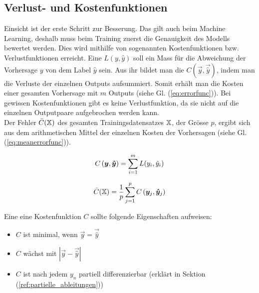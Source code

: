 \subsection{Verlust- und Kostenfunktionen}
Einsicht ist der erste Schritt zur Besserung. Das gilt auch beim Machine Learning, deshalb muss beim Training zuerst die Genauigkeit des Modells bewertet werden.
Dies wird mithilfe von sogenannten Kostenfunktionen bzw. Verlustfunktionen erreicht.
\para{}
Eine  $L(y,\hat{y})$ soll ein Mass für die
Abweichung der Vorhersage $y$ von dem Label $\hat{y}$ sein.
Aus ihr bildet man die  $C(\vec{y},\vec{\hat{y}})$, indem man die
Verluste der einzelnen Outputs aufsummiert. Somit erhält man die Kosten
einer gesamten Vorhersage mit $m$ Outputs (siehe Gl. (\ref{eq:errorfunc})). Bei
gewissen Kostenfunktionen gibt es keine Verlustfunktion, da sie nicht auf die
einzelnen Outputpaare aufgebrochen werden kann. \\
Der Fehler $\bar{C}(\mathbb{X})$ des gesamten Trainingsdatensatzes $\mathbb{X}$, der
Grösse $p$, ergibt sich aus dem arithmetischen Mittel der einzelnen Kosten der
Vorhersagen (siehe Gl. (\ref{eq:meanerrorfunc})).
\\
\begin{minipage}[h!]{0.5\textwidth}
  \begin{equation}\label{eq:errorfunc}
    C \left(\bm{y},\bm{\hat{y}} \right) = \displaystyle\sum_{i=1}^{m} L(y_i, \hat{y}_i)
  \end{equation}
\end{minipage}
\begin{minipage}[h!]{0.5\textwidth}
  \begin{equation}\label{eq:meanerrorfunc}
    \bar{C}(\mathbb{X}) = \frac{1}{p}\displaystyle\sum_{j=1}^{p} C\left(\bm{y}_j,\bm{\hat{y}}_j\right)
  \end{equation}
\end{minipage}
\para{}
Eine eine Kostenfunktion $C$ sollte folgende Eigenschaften aufweisen:
\begin{itemize}
\item{$C$ ist minimal, wenn $\vec{y} = \vec{\hat{y}}$}
\item{$C$ wächst mit $|\vec{y} - \vec{\hat{y}}|$}
\item{$C$ ist nach jedem $y_n$ partiell differenzierbar (erklärt in Sektion (\ref{ref:partielle_ableitungen}))}
\end{itemize}
\para{}

\cite{Nielsen}

